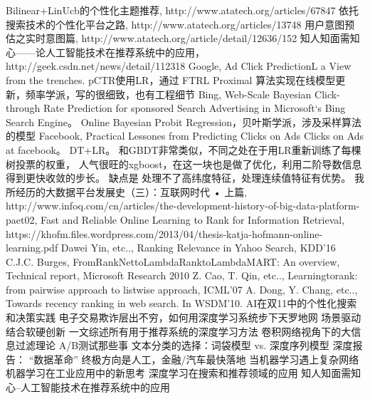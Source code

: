 \begin{thebibliography}{99}
 Bilinear+LinUcb的个性化主题推荐, http://www.atatech.org/articles/67847
 依托搜索技术的个性化平台之路, http://www.atatech.org/articles/13748
 用户意图预估之实时意图篇, http://www.atatech.org/article/detail/12636/152
 知人知面需知心——论人工智能技术在推荐系统中的应用，http://geek.csdn.net/news/detail/112318
 Google, Ad Click PredictionL a View from the trenches. pCTR使用LR，通过
FTRL Proximal 算法实现在线模型更新，频率学派，写的很细致，也有工程细节
 Bing, Web-Scale Bayesian Click-through Rate Prediction for sponsored 
Search Advertising in Microsoft‘s Bing Search Engine。 Online Bayesian Probit Regression，贝叶斯学派，涉及采样算法的模型
 Facebook, Practical Lessones from Predicting Clicks on Ads Clicks 
on Ads at facebook。 DT+LR。 和GBDT非常类似，不同之处在于用LR重新训练了每棵树投票的权重，
人气很旺的xgboost，在这一块也是做了优化，利用二阶导数信息得到更快收敛的步长。 缺点是
处理不了高纬度特征，处理连续值特征有优势。
 我所经历的大数据平台发展史（三）：互联网时代 • 上篇, http://www.infoq.com/cn/articles/the-development-history-of-big-data-platform-paet02, 
 Fast and Reliable Online Learning to Rank
for Information Retrieval, https://khofm.files.wordpress.com/2013/04/thesis-katja-hofmann-online-learning.pdf
 Dawei Yin, etc.., Ranking Relevance in Yahoo Search, KDD'16 
 C.J.C. Burges, FromRankNettoLambdaRanktoLambdaMART: An overview, Technical 
report, Microsoft Research 2010
 Z. Cao, T. Qin, etc.., Learningtorank: from pairwise approach to listwise approach, ICML'07 
 A. Dong, Y. Chang, etc.., Towards recency ranking in web search. In WSDM'10. 
 AI在双11中的个性化搜索和决策实践
 电子交易欺诈层出不穷，如何用深度学习系统步下天罗地网
 场景驱动结合软硬创新
 一文综述所有用于推荐系统的深度学习方法
 卷积网络视角下的大信息过滤理论
 A/B测试那些事 
 文本分类的选择：词袋模型 vs. 深度序列模型
 深度报告： “数据革命” 终极方向是人工，金融/汽车最快落地
 当机器学习遇上复杂网络
 机器学习在工业应用中的新思考
 深度学习在搜索和推荐领域的应用
 知人知面需知心--人工智能技术在推荐系统中的应用




\end{thebibliography}

 
